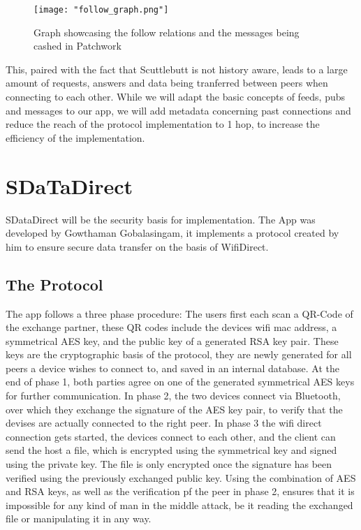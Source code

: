 \begin{figure}[!t]
	\centering
	\texttt{[image: "follow\_graph.png"]}
	\caption{Graph showcasing the follow relations and the messages being cashed in Patchwork\cite{ScuttlebuttProtocol}}
	\label{fig:followGraph}
\end{figure}

This, paired with the fact that Scuttlebutt is not history aware, leads to a large amount of requests, answers and data being tranferred between peers when connecting to each other. While we will adapt the basic concepts of feeds, pubs and messages to our app, we will add metadata concerning past connections and reduce the reach of the protocol implementation to 1 hop, to increase the efficiency of the implementation.

\section{SDaTaDirect}
\label{sec:SDataDirect}
SDataDirect will be the security basis for implementation. The App was developed by Gowthaman Gobalasingam, it implements a protocol created by him to ensure secure data transfer on the basis of WifiDirect\cite{SDaTaDirect}.
\subsection{The Protocol}
The app follows a three phase procedure: The users first each scan a QR-Code of the exchange partner, these QR codes include the devices wifi mac address, a symmetrical AES key, and the public key of a generated RSA key pair. These keys are the cryptographic basis of the protocol, they are newly generated for all peers a device wishes to connect to, and saved in an internal database. At the end of phase 1, both parties agree on one of the generated symmetrical AES keys for further communication. In phase 2, the two devices connect via Bluetooth, over which they exchange the signature of the AES key pair, to verify that the devises are actually connected to the right peer. In phase 3 the wifi direct connection gets started, the devices connect to each other, and the client can send the host a file, which is encrypted using the symmetrical key and signed using the private key. The file is only encrypted once the signature has been verified using the previously exchanged public key. Using the combination of AES and RSA keys, as well as the verification pf the peer in phase 2, ensures that it is impossible for any kind of man in the middle attack, be it reading the exchanged file or manipulating it in any way. 
